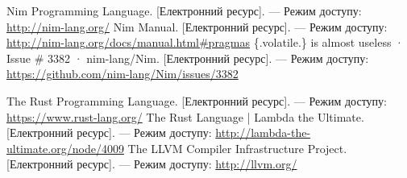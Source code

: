 \documentclass[oneside,14pt,a4paper,final]{myextreport}
\newcommand{\eresource}[2]{#1. [Електронний ресурс]. --- Режим доступу: \url{#2}}
\begin{document}
\begin{thebibliography}{00}
    \eresource{Nim Programming Language}{http://nim-lang.org/}
    \eresource{Nim Manual}{http://nim-lang.org/docs/manual.html\#pragmas}
    \eresource{\{.volatile.\} is almost useless · Issue \# 3382 · nim-lang/Nim}{https://github.com/nim-lang/Nim/issues/3382}

    \eresource{The Rust Programming Language}{https://www.rust-lang.org/}
    \eresource{The Rust Language | Lambda the Ultimate}{http://lambda-the-ultimate.org/node/4009}
    \eresource{The LLVM Compiler Infrastructure Project}{http://llvm.org/}

\end{thebibliography}
\end{document}
